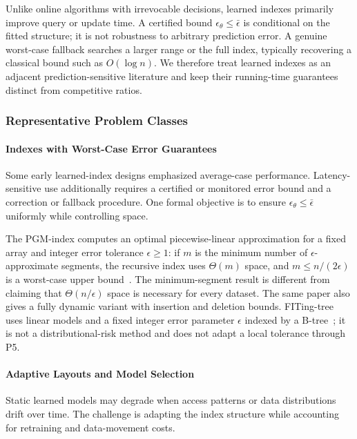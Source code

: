 \documentclass[acmsmall,screen,nonacm]{acmart}
\theoremstyle{acmdefinition}%
\begin{document}
Unlike online algorithms with irrevocable decisions, learned indexes primarily improve query or update time. A certified bound $\epsilon_\theta\le\bar\epsilon$ is conditional on the fitted structure; it is not robustness to arbitrary prediction error. A genuine worst-case fallback searches a larger range or the full index, typically recovering a classical bound such as $O(\log n)$. We therefore treat learned indexes as an adjacent prediction-sensitive literature and keep their running-time guarantees distinct from competitive ratios.


\subsubsection{Representative Problem Classes}

\paragraph{Indexes with Worst-Case Error Guarantees}
Some early learned-index designs emphasized average-case performance. Latency-sensitive use additionally requires a certified or monitored error bound and a correction or fallback procedure. One formal objective is to ensure $\epsilon_\theta \leq \bar{\epsilon}$ uniformly while controlling space.

The PGM-index computes an optimal piecewise-linear approximation for a fixed array and integer error tolerance $\epsilon\geq1$: if $m$ is the minimum number of $\epsilon$-approximate segments, the recursive index uses $\Theta(m)$ space, and $m\le n/(2\epsilon)$ is a worst-case upper bound~\cite{ferragina2020pgm}. The minimum-segment result is different from claiming that $\Theta(n/\epsilon)$ space is necessary for every dataset. The same paper also gives a fully dynamic variant with insertion and deletion bounds. FITing-tree uses linear models and a fixed integer error parameter $\epsilon$ indexed by a B-tree~\cite{galakatos2019fiting}; it is not a distributional-risk method and does not adapt a local tolerance through P5.

\paragraph{Adaptive Layouts and Model Selection}
Static learned models may degrade when access patterns or data distributions drift over time. The challenge is adapting the index structure while accounting for retraining and data-movement costs.
\end{document}
